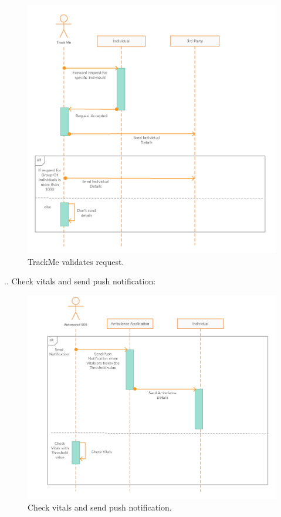 \begin{figure}[H]
	\begin{center}
		\includegraphics[width=\textwidth]{./RASD_Sequence/3__TrackMe.png}
      	\caption{TrackMe validates request.}
        \label{TrackMe_seq3}
	\end{center}
\end{figure}
.\newline\newline\newline\newline\newline\newline\newline{}. Check vitals and send push notification:
\begin{figure}[H]
	\begin{center}
		\includegraphics[width=\textwidth]{./RASD_Sequence/4_Automated_SOS.png}
      	\caption{Check vitals and send push notification.}
        \label{TrackMe_seq4}
	\end{center}
\end{figure}
